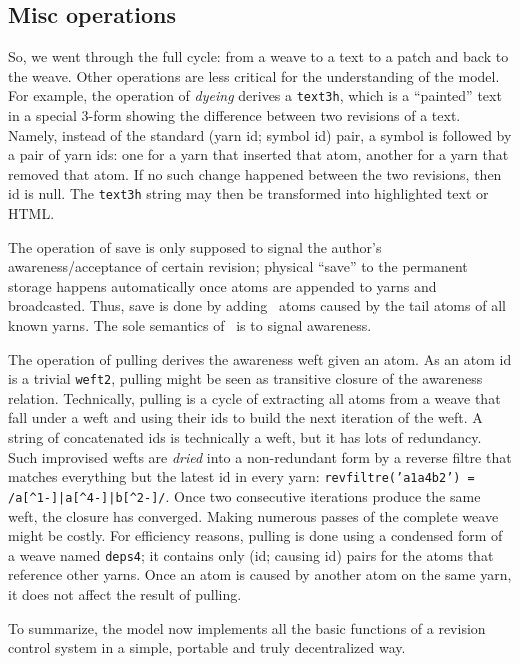 \documentclass{acm_proc_article-sp}
\begin{document}
\subsection{Misc operations}

So, we went through the full cycle: from a weave to a text
to a patch and back to the weave. Other operations are less
critical for the understanding of the model. For example, the
operation of \emph{dyeing} derives a {\tt text3h}, which is a
``painted'' text in a special 3-form showing the difference
between two revisions of a text. Namely, instead of the standard
(yarn id; symbol id) pair, a symbol is followed by a pair
of yarn ids: one for a yarn that inserted that atom,
another for a yarn that removed that atom. If no such
change happened between the two revisions, then id is null.
The {\tt text3h} string may then be transformed into
highlighted text or HTML.

The operation of save is only supposed to signal the author's
awareness/acceptance of certain revision; physical ``save''
to the permanent storage happens automatically once atoms are
appended to yarns and broadcasted. Thus, save is done by 
adding \zero ~atoms caused by the tail atoms of all known yarns.
The sole semantics of \zero ~is to signal awareness.

The operation of pulling derives the awareness weft given an
atom. As an atom id is a trivial {\tt weft2}, pulling might
be seen as transitive closure of the awareness relation.
Technically, pulling is a cycle of extracting all atoms from
a weave that fall under a weft and using their ids to build
the next iteration of the weft. A string of concatenated
ids is technically a weft, but it has lots of redundancy.
Such improvised wefts are \emph{dried} into a non-redundant
form by a reverse filtre that matches everything but the
latest id in every yarn:
{\tt revfiltre('a1a4b2') = \verb+/a[^1-]|a[^4-]|b[^2-]/+}.
Once two consecutive iterations produce the same weft,
the closure has converged. Making numerous passes of the
complete weave might be costly. For efficiency reasons,
pulling is done using a
condensed form of a weave named {\tt deps4}; it contains only
(id; causing id) pairs for the atoms that reference other
yarns. Once an atom is caused by another atom on the same
yarn, it does not affect the result of pulling. 

To summarize, the model now implements all the basic
functions of a revision control system in a simple, 
portable and truly decentralized way.
\end{document}
